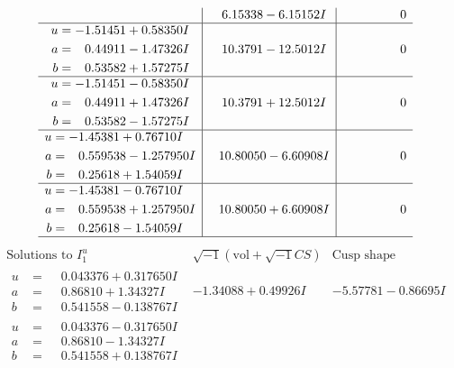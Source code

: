 \documentclass[1p]{elsarticle_modified}
\theoremstyle{definition}
\newcommand{\I}{\sqrt{-1}}
\begin{document}
$$\begin{array}{c|c|c}
 & \phantom{-}6.15338 - 6.15152 I & \phantom{-0.000000 } 0 \\ \hline\begin{aligned}
u &= -1.51451 + 0.58350 I \\
a &= \phantom{-}0.44911 - 1.47326 I \\
b &= \phantom{-}0.53582 + 1.57275 I\end{aligned}
 & \phantom{-}10.3791 - 12.5012 I & \phantom{-0.000000 } 0 \\ \hline\begin{aligned}
u &= -1.51451 - 0.58350 I \\
a &= \phantom{-}0.44911 + 1.47326 I \\
b &= \phantom{-}0.53582 - 1.57275 I\end{aligned}
 & \phantom{-}10.3791 + 12.5012 I & \phantom{-0.000000 } 0 \\ \hline\begin{aligned}
u &= -1.45381 + 0.76710 I \\
a &= \phantom{-}0.559538 - 1.257950 I \\
b &= \phantom{-}0.25618 + 1.54059 I\end{aligned}
 & \phantom{-}10.80050 - 6.60908 I & \phantom{-0.000000 } 0 \\ \hline\begin{aligned}
u &= -1.45381 - 0.76710 I \\
a &= \phantom{-}0.559538 + 1.257950 I \\
b &= \phantom{-}0.25618 - 1.54059 I\end{aligned}
 & \phantom{-}10.80050 + 6.60908 I & \phantom{-0.000000 } 0\\
 \hline 
 \end{array}$$\newpage$$\begin{array}{c|c|c}  
\text{Solutions to }I^u_{1}& \I (\text{vol} + \sqrt{-1}CS) & \text{Cusp shape}\\
 \hline 
\begin{aligned}
u &= \phantom{-}0.043376 + 0.317650 I \\
a &= \phantom{-}0.86810 + 1.34327 I \\
b &= \phantom{-}0.541558 - 0.138767 I\end{aligned}
 & -1.34088 + 0.49926 I & -5.57781 - 0.86695 I \\ \hline\begin{aligned}
u &= \phantom{-}0.043376 - 0.317650 I \\
a &= \phantom{-}0.86810 - 1.34327 I \\
b &= \phantom{-}0.541558 + 0.138767 I\end{aligned}

\end{array}$$
\end{document}
